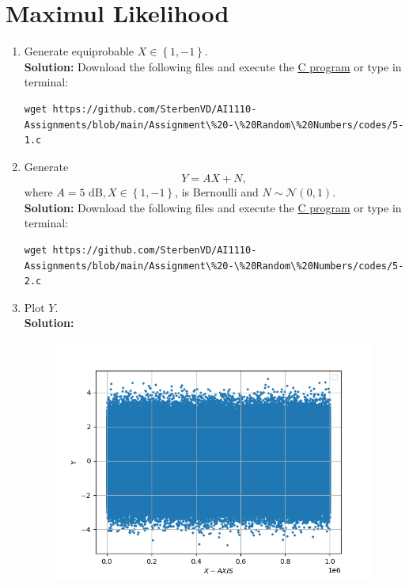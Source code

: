 \documentclass[journal,12pt,twocolumn]{IEEEtran}
\numberwithin{equation}{section}
\renewcommand\thesection{\arabic{section}}
\providecommand{\cbrak}[1]{\ensuremath{\left\{#1\right\}}}
\providecommand{\gauss}[2]{\mathcal{N}\ensuremath{\left(#1,#2\right)}}
\providecommand{\gitlink}[2]{{\color{blue}\href{https://github.com/SterbenVD/AI1110-Assignments/blob/main/Assignment\%20-\%20Random\%20Numbers/#1}{#2}}}
\newcommand{\solution}{\noindent \textbf{\\ Solution: }}
\begin{document}
\section{Maximul Likelihood}
\begin{enumerate}[label=\thesection.\arabic*
        ,ref=\thesection.\theenumi]
    \item Generate equiprobable $X \in \cbrak{1,-1}$.
          \solution Download the following files and execute the \gitlink{codes/5-1.c}{C program} or type in terminal:
          \begin{lstlisting}
wget https://github.com/SterbenVD/AI1110-Assignments/blob/main/Assignment\%20-\%20Random\%20Numbers/codes/5-1.c
                    \end{lstlisting}
    \item Generate
          \begin{equation}
              Y = AX+N,
          \end{equation}
          where $A = 5 \text{ dB}, X \in \cbrak{1,-1}$,  is Bernoulli and $N \sim \gauss{0}{1}$.
          \solution Download the following files and execute the \gitlink{codes/5-2.c}{C program} or type in terminal:
          \begin{lstlisting}
wget https://github.com/SterbenVD/AI1110-Assignments/blob/main/Assignment\%20-\%20Random\%20Numbers/codes/5-2.c
                    \end{lstlisting}
    \item Plot $Y$.
          \solution
          \begin{figure}[H]
              \centering
              \includegraphics[width = \columnwidth]{../figs/5_Y}

\end{figure}
\end{enumerate}
\end{document}
